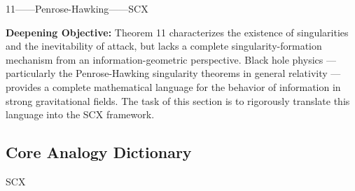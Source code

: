 \documentclass[12pt,a4paper]{article}
\theoremstyle{remark}
\begin{document}
\vspace{4pt}
\noindent
\textbf{} 11——Penrose-Hawking——SCX

\vspace{4pt}
\noindent
\textbf{Deepening Objective:} Theorem 11 characterizes the existence of singularities and the inevitability of attack, but lacks a complete singularity-formation mechanism from an information-geometric perspective. Black hole physics — particularly the Penrose-Hawking singularity theorems in general relativity — provides a complete mathematical language for the behavior of information in strong gravitational fields. The task of this section is to rigorously translate this language into the SCX framework.

\subsection{}
\subsection{Core Analogy Dictionary}

SCX
\end{document}
